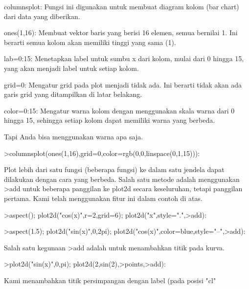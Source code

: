 \documentclass[a4paper,10pt]{article}
\begin{document}
\begin{eulernotebook}
\begin{eulercomment}
\begin{eulercomment}
\begin{eulercomment}
\begin{eulercomment}
\begin{eulercomment}
columnsplot: Fungsi ini digunakan untuk membuat diagram kolom (bar
chart) dari data yang diberikan.

ones(1,16): Membuat vektor baris yang berisi 16 elemen, semua bernilai
1. Ini berarti semua kolom akan memiliki tinggi yang sama (1).

lab=0:15: Menetapkan label untuk sumbu x dari kolom, mulai dari 0
hingga 15, yang akan menjadi label untuk setiap kolom.

grid=0: Mengatur grid pada plot menjadi tidak ada. Ini berarti tidak
akan ada garis grid yang ditampilkan di latar belakang.

color=0:15: Mengatur warna kolom dengan menggunakan skala warna dari 0
hingga 15, sehingga setiap kolom dapat memiliki warna yang berbeda.

Tapi Anda bisa menggunakan warna apa saja.
\end{eulercomment}
\begin{eulerprompt}
>columnsplot(ones(1,16),grid=0,color=rgb(0,0,linspace(0,1,15))):
\end{eulerprompt}
\begin{eulercomment}
Plot lebih dari satu fungsi (beberapa fungsi) ke dalam satu jendela
dapat dilakukan dengan cara yang berbeda. Salah satu metode adalah
menggunakan \textgreater{}add untuk beberapa panggilan ke plot2d secara
keseluruhan, tetapi panggilan pertama. Kami telah menggunakan fitur
ini dalam contoh di atas.
\end{eulercomment}
\begin{eulerprompt}
>aspect(); plot2d("cos(x)",r=2,grid=6); plot2d("x",style=".",>add):
\end{eulerprompt}
\begin{eulerprompt}
>aspect(1.5); plot2d("sin(x)",0,2pi); plot2d("cos(x)",color=blue,style="--",>add):
\end{eulerprompt}
\begin{eulercomment}
Salah satu kegunaan \textgreater{}add adalah untuk menambahkan titik pada kurva.
\end{eulercomment}
\begin{eulerprompt}
>plot2d("sin(x)",0,pi); plot2d(2,sin(2),>points,>add):
\end{eulerprompt}
\begin{eulercomment}
Kami menambahkan titik persimpangan dengan label (pada posisi "cl"

\end{eulercomment}
\end{eulercomment}
\end{eulercomment}
\end{eulercomment}
\end{eulercomment}
\end{eulernotebook}
\end{document}
